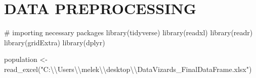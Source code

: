 \documentclass[
  11pt,
  a4paper,
  DIV=11,
  numbers=noendperiod]{scrartcl}
\newenvironment{Shaded}{\begin{snugshade}}{\end{snugshade}}
\newcommand{\CommentTok}[1]{\textcolor[rgb]{0.37,0.37,0.37}{#1}}
\newcommand{\FunctionTok}[1]{\textcolor[rgb]{0.28,0.35,0.67}{#1}}
\newcommand{\NormalTok}[1]{\textcolor[rgb]{0.00,0.23,0.31}{#1}}
\newcommand{\OtherTok}[1]{\textcolor[rgb]{0.00,0.23,0.31}{#1}}
\newcommand{\SpecialCharTok}[1]{\textcolor[rgb]{0.37,0.37,0.37}{#1}}
\newcommand{\StringTok}[1]{\textcolor[rgb]{0.13,0.47,0.30}{#1}}
\begin{document}
\hypertarget{data-preprocessing}{%
\section{DATA PREPROCESSING}\label{data-preprocessing}}

\begin{Shaded}
\begin{Highlighting}[]
\CommentTok{\# importing necessary packages}
\FunctionTok{library}\NormalTok{(tidyverse)}
\FunctionTok{library}\NormalTok{(readxl)}
\FunctionTok{library}\NormalTok{(readr)}
\FunctionTok{library}\NormalTok{(gridExtra)}
\FunctionTok{library}\NormalTok{(dplyr)}

\NormalTok{population }\OtherTok{\textless{}{-}} \FunctionTok{read\_excel}\NormalTok{(}\StringTok{"C:}\SpecialCharTok{\textbackslash{}\textbackslash{}}\StringTok{Users}\SpecialCharTok{\textbackslash{}\textbackslash{}}\StringTok{melek}\SpecialCharTok{\textbackslash{}\textbackslash{}}\StringTok{desktop}\SpecialCharTok{\textbackslash{}\textbackslash{}}\StringTok{DataVizards\_FinalDataFrame.xlsx"}\NormalTok{)}

\end{Highlighting}
\end{Shaded}
\end{document}
